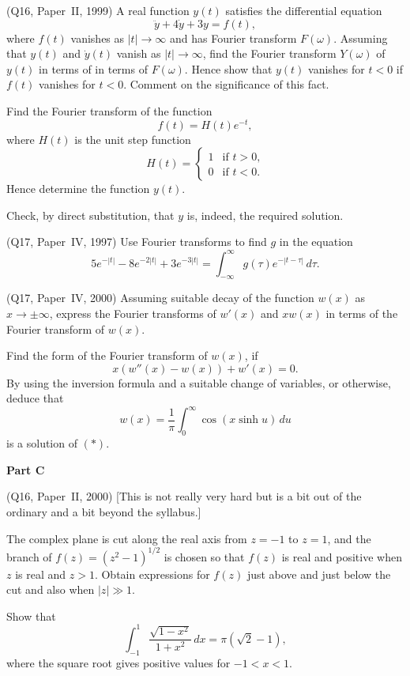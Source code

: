 \begin{question} (Q16, Paper~II, 1999) A real function
$y(t)$ satisfies the differential equation
\[\ddot{y}+4\dot{y}+3y=f(t),\]
where $f(t)$ vanishes as $|t|\rightarrow\infty$ and has
Fourier transform $F(\omega)$. Assuming that $y(t)$
and $\dot{y}(t)$ vanish as $|t|\rightarrow\infty$,
find the Fourier transform $Y(\omega)$ of $y(t)$
in terms of in terms of $F(\omega)$. Hence show that
$y(t)$ vanishes for $t<0$ if $f(t)$ vanishes for $t<0$.
Comment on the significance of this fact.

Find the Fourier transform of the function
\[f(t)=H(t)e^{-t},\]
where $H(t)$ is the unit step function
\begin{equation*}
H(t)=
\begin{cases}
1& \text{if $t>0$,}\\
0& \text{if $t<0$.}
\end{cases}
\end{equation*}
Hence determine the function $y(t)$.

Check, by direct substitution, that $y$ is, indeed, the 
required solution.

\end{question}
\begin{question} (Q17, Paper~IV, 1997) Use
Fourier transforms to find $g$ in the equation
\[5e^{-|t|}-8e^{-2|t|}+3e^{-3|t|}
=\int_{-\infty}^{\infty}g(\tau)e^{-|t-\tau|}\,d\tau.\]
\end{question}
\begin{question} (Q17, Paper~IV, 2000)
Assuming suitable decay of the function $w(x)$
as $x\rightarrow\pm\infty$, express the Fourier transforms
of $w'(x)$ and $xw(x)$ in terms of the Fourier transform of
$w(x)$.

Find the form of the Fourier transform of $w(x)$, if
\begin{equation*}
\tag*{($*$)}
x(w''(x)-w(x))+w'(x)=0.
\end{equation*}
By using the inversion formula and a suitable
change of variables, or otherwise, deduce that
\[w(x)=\frac{1}{\pi}\int_{0}^{\infty}
\cos(x\sinh u)\,du\]
is a solution of $(*)$.
\end{question}
\begin{center}
\bf{Part C}
\end{center}
\begin{question}(Q16, Paper~II, 2000) [This is not
really very hard but is a bit out of the ordinary
and a bit beyond the syllabus.]

The complex plane is cut along the real axis from $z=-1$
to $z=1$, and the branch of $f(z)=(z^{2}-1)^{1/2}$ is chosen
so that $f(z)$ is real and positive when $z$ is real
and $z>1$. Obtain expressions for $f(z)$ just above and
just below the cut and also when $|z|\gg 1$.

Show that
\[\int_{-1}^{1}\frac{\sqrt{1-x^{2}}}{1+x^{2}}\,dx
=\pi(\sqrt{2}-1),\]
where the square root gives positive values for $-1<x<1$.
\end{question}


